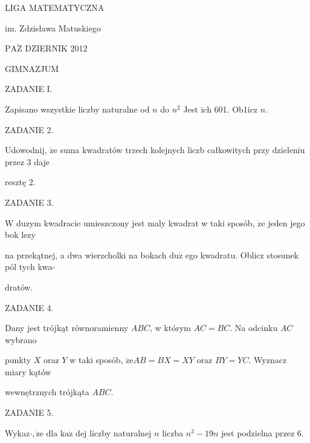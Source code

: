 \documentclass[a4paper,12pt]{article}
\begin{document}
LIGA MATEMATYCZNA

im. Zdzisława Matuskiego

$\mathrm{P}\mathrm{A}\acute{\mathrm{Z}}$ DZIERNIK 2012

GIMNAZJUM

ZADANIE I.

Zapisano wszystkie liczby naturalne od $n$ do $n^{2}$ Jest ich 601. Ob1icz $n.$

ZADANIE 2.

Udowodnij, $\dot{\mathrm{z}}\mathrm{e}$ suma kwadratów trzech kolejnych liczb całkowitych przy dzieleniu przez 3 daje

resztę 2.

ZADANIE 3.

$\mathrm{W}$ duzym kwadracie umieszczony jest maly kwadrat w taki sposób, $\dot{\mathrm{z}}\mathrm{e}$ jeden jego bok lezy

na przekątnej, a dwa wierzcholki na bokach $\mathrm{d}\mathrm{u}\dot{\mathrm{z}}$ ego kwadratu. Oblicz stosunek pól tych kwa-

dratów.

ZADANIE 4.

Dany jest trójkąt równoramienny $ABC$, w którym $AC = BC$. Na odcinku $AC$ wybrano

punkty $X$ oraz $Y$ w taki sposób, $\dot{\mathrm{z}}\mathrm{e}AB=BX=XY$ oraz $BY=YC$. Wyznacz miary kątów

wewnętrznych trójkąta $ABC.$

ZADANIE 5.

Wykaz$\cdot, \dot{\mathrm{z}}\mathrm{e}$ dla $\mathrm{k}\mathrm{a}\dot{\mathrm{z}}$ dej liczby naturalnej $n$ liczba $n^{3}-19n$ jest podzielna przez 6.
\end{document}
